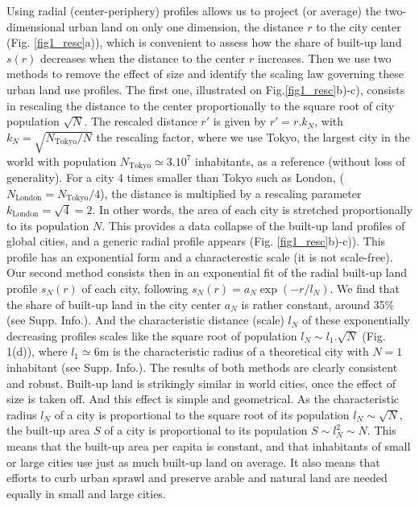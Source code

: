 \documentclass[sn-mathphys-num]{sn-jnl}%
\theoremstyle{thmstyleone}%
\theoremstyle{thmstyletwo}%
\theoremstyle{thmstylethree}%
\begin{document}
Using radial (center-periphery) profiles allows us to project (or average) the two-dimensional urban land on only one dimension, the distance $r$ to the city center (Fig. \ref{fig1_resc}a)), which is convenient to assess how the share of built-up land $s(r)$ decreases when the distance to the center $r$ increases. Then we use two methods to remove the effect of size and identify the scaling law governing these urban land use profiles. The first one, illustrated on Fig.\ref{fig1_resc}b)-c), consists in rescaling the distance to the center proportionally to the square root of city population $\sqrt{N}$. The rescaled distance $r'$ is given by $r'=r.k_N$, with $k_N=\sqrt{N_{\text{Tokyo}}/N}$ the rescaling factor, where we use Tokyo, the largest city in the world with population $N_{\text{Tokyo}} \simeq 3.10^7$ inhabitants, as a reference (without loss of generality). For a city 4 times smaller than Tokyo such as London, ($N_{\text{London}}=N_{\text{Tokyo}}/4$), the distance is multiplied by a rescaling parameter $k_{\text{London}}=\sqrt{4}=2$. In other words, the area of each city is stretched proportionally to its population $N$. This provides a data collapse of the built-up land profiles of global cities, and a generic radial profile appears (Fig. \ref{fig1_resc}b)-c)). This profile has an exponential form and a characterestic scale (it is not scale-free). Our second method consists then in an exponential fit of the radial built-up land profile $s_N(r)$ of each city, following $s_N(r)=a_N \exp (-r/l_N)$. We find that the share of built-up land in the city center $a_N$ is rather constant, around 35\% (see Supp. Info.). And the characteristic distance (scale) $l_N$ of these exponentially decreasing profiles scales like the square root of population $l_N \sim l_1.\sqrt{N}$ (Fig. 1(d)), where $l_1\simeq 6$m is the characteristic radius of a theoretical city with $N=1$ inhabitant (see Supp. Info.). The results of both methods are clearly consistent and robust. Built-up land is strikingly similar in world cities, once the effect of size is taken off. And this effect is simple and geometrical. As the characteristic radius $l_N$ of a city is proportional to the square root of its population $l_N\sim \sqrt{N}$, the built-up area $S$ of a city is proportional to its population  $S\sim l_N^2\sim N$. This means that the built-up area per capita is constant, and that inhabitants of small or large cities use just as much built-up land on average. It also means that efforts to curb urban sprawl and preserve arable and natural land are needed equally in small and large cities.
\end{document}
